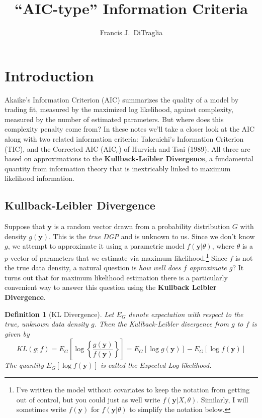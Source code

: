 \documentclass[12pt]{article}
\newtheorem{defn}{Definition}[section]
\theoremstyle{definition}
\begin{document}
\title{``AIC-type'' Information Criteria}

\author{Francis J.\ DiTraglia}

\maketitle

 

\section{Introduction}
Akaike's Information Criterion (AIC) summarizes the quality of a model by trading fit, measured by the maximized log likelihood, against complexity, measured by the number of estimated parameters. But where does this complexity penalty come from? In these notes we'll take a closer look at the AIC along with two related information criteria: Takeuichi's Information Criterion (TIC), and the Corrected AIC (AIC$_c$) of Hurvich and Tsai (1989). All three are based on approximations to the \textbf{Kullback-Leibler Divergence}, a fundamental quantity from information theory that is inextricably linked to maximum likelihood information.


\subsection{Kullback-Leibler Divergence}
Suppose that $\mathbf{y}$ is a random vector drawn from a probability distribution $G$ with density $g(\mathbf{y})$. This is the \emph{true DGP} and is unknown to us. Since we don't know $g$, we attempt to approximate it using a parametric model $f(\mathbf{y}|\theta)$, where $\theta$ is a $p$-vector of parameters that we estimate via maximum likelihood.\footnote{I've written the model without covariates to keep the notation from getting out of control, but you could just as well write $f(\mathbf{y}|X,\theta)$. Similarly, I will sometimes write $f(\mathbf{y})$ for $f(\mathbf{y}|\theta)$ to simplify the notation below. } Since $f$ is not the true data density, a natural question is \emph{how well does $f$ approximate $g$}? It turns out that for maximum likelihood estimation there is a particularly convenient way to answer this question using the \textbf{Kullback Leibler Divergence}.


\begin{defn}[KL Divergence]
Let $E_G$ denote expectation with respect to the true, unknown data density $g$. Then the Kullback-Leibler divergence from $g$ to $f$ is given by
$$KL(g;f) = E_G \left[ \log{\left\{\frac{g(\textbf{y})}{f(\textbf{y})}\right\}}\right]= E_G\left[ \log{g(\textbf{y})}\right] - E_G\left[ \log{f(\textbf{y})} \right]$$
The quantity $E_G\left[ \log{f(\mathbf{y})} \right]$ is called the Expected Log-likelihood.
\end{defn}
\end{document}
